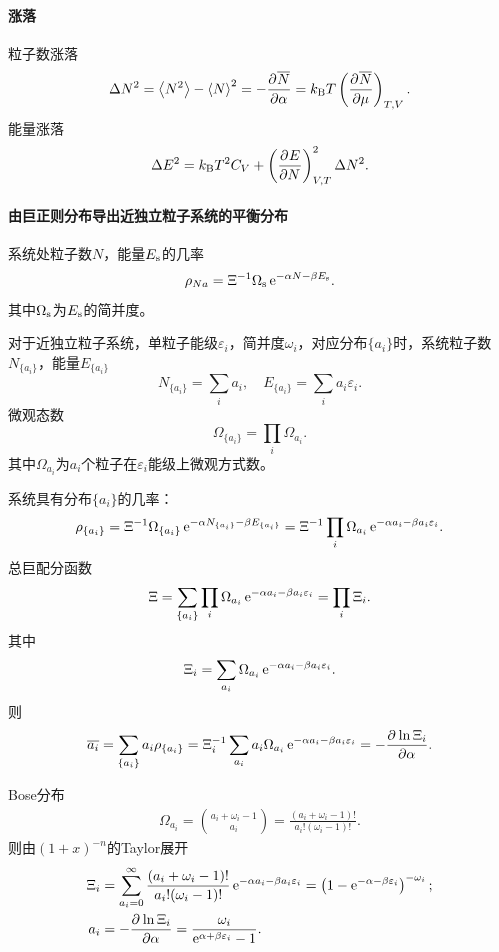 \paragraph{涨落}
粒子数涨落
\begin{align}
	\Delta N^2=\left\langle N^2\right\rangle-\left\langle N\right\rangle^2=-\frac{\partial^{{}}\overline{N}}{\partial{\alpha}^{{}}}=k_{\mathrm B} T\left(\frac{\partial^{{}}\overline{N}}{\partial{\mu}^{{}}}\right)_{T,V}.
\end{align}
能量涨落
\begin{align}
	\Delta E^2=k_{\mathrm B} T^2C_V+\left(\frac{\partial^{{}}E}{\partial{N}^{{}}}\right)_{V,T}^2\Delta N^2.
\end{align}
\paragraph{由巨正则分布导出近独立粒子系统的平衡分布}系统处粒子数$N$，能量$E_\mathrm s$的几率
\[
	\rho_{Na}=\Xi^{-1}\Omega_\mathrm s\mathop{}\!\mathrm{e}^{-\alpha N-\beta E_\mathrm s}.
\]
其中$\Omega_\mathrm s$为$E_\mathrm s$的简并度。

对于近独立粒子系统，单粒子能级$\varepsilon_i$，简并度$\omega_i$，对应分布$\{a_i\}$时，系统粒子数$N_{\{a_i\}}$，能量$E_{\{a_i\}}$
\[
	N_{\{a_i\}}=\sum_ia_i,\quad E_{\{a_i\}}=\sum_ia_i\varepsilon_i.
\]
微观态数
\[
	\Omega_{\{a_i\}}=\prod_i\Omega_{a_i}.
\]
其中$\Omega_{a_i}$为$a_i$个粒子在$\varepsilon_i$能级上微观方式数。

系统具有分布$\{a_i\}$的几率：
\[
	\rho_{\{a_i\}}=\Xi^{-1}\Omega_{\{a_i\}}\mathop{}\!\mathrm{e}^{-\alpha N_{\{a_i\}}-\beta E_{\{a_i\}}}=\Xi^{-1}\prod_i\Omega_{a_i}\mathop{}\!\mathrm{e}^{-\alpha{a_i}-\beta{a_i\varepsilon_i}}.
\]
总巨配分函数
\[
	\Xi=\sum_{\{a_i\}}\prod_i\Omega_{a_i}\mathop{}\!\mathrm{e}^{-\alpha{a_i}-\beta{a_i\varepsilon_i}}=\prod_i\Xi_i.
\]
其中 
\[
	\Xi_i=\sum_{a_i}\Omega_{a_i}\mathop{}\!\mathrm{e}^{-\alpha{a_i}-\beta{a_i\varepsilon_i}}.
\]
则
\begin{align*}
	\overline{a_i}=\sum_{\{a_i\}}a_i\rho_{\{a_i\}}=\Xi_i^{-1}\sum_{a_i}a_i\Omega_{a_i}\mathop{}\!\mathrm{e}^{-\alpha{a_i}-\beta{a_i\varepsilon_i}}=-\frac{\partial^{{}}\ln\Xi_i}{\partial{\alpha}^{{}}}.
\end{align*}

Bose分布
\begin{align}
	\Omega_{a_i}=\binom{a_i+\omega_i-1}{a_i}=\frac{(a_i+\omega_i-1)!}{a_i!(\omega_i-1)!}.
\end{align}
则由$(1+x)^{-n}$的Taylor展开
\begin{align}
	\Xi_i&=\sum_{a_i=0}^\infty\frac{(a_i+\omega_i-1)!}{a_i!(\omega_i-1)!}\mathop{}\!\mathrm{e}^{-\alpha a_i-\beta a_i\varepsilon_i}=\left(1-\mathop{}\!\mathrm{e}^{-\alpha-\beta\varepsilon_i}\right)^{-\omega_i};\\
	a_i&=-\frac{\partial^{{}}\ln\Xi_i}{\partial{\alpha}^{{}}}=\frac{\omega_i}{\mathop{}\!\mathrm{e}^{\alpha+\beta\varepsilon_i}-1}.
\end{align}

